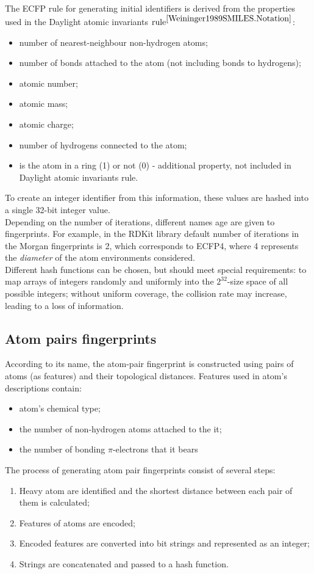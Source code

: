  The ECFP rule for generating initial identifiers is derived from the properties used in the Daylight atomic invariants $\text{rule}^{\cite{Weininger1989SMILES.Notation}}$:
 \begin{itemize}
     \item number of nearest-neighbour non-hydrogen atoms;
     \item number of bonds attached to the atom (not including bonds to hydrogens);
     \item atomic number;
     \item atomic mass;
     \item atomic charge;
     \item number of hydrogens connected to the atom;
     \item is the atom in a ring (1) or not (0) - additional property, not included in Daylight atomic invariants rule.
 \end{itemize}
 To create an integer identifier from this information, these values are hashed into a single 32-bit integer value.\\
 
 Depending on the number of iterations, different names age are given to fingerprints.
 For example, in the RDKit library default number of iterations in the Morgan fingerprints is 2, which corresponds to ECFP4, where 4 represents the \textit{diameter} of the atom environments considered.\\
 
 Different hash functions can be chosen, but should meet special requirements: to map arrays of integers randomly and uniformly into the $2^{32}$-size space of all possible integers; without uniform coverage, the collision rate may increase, leading to a loss of information.

\subsection{Atom pairs fingerprints}
 According to its name, the atom-pair fingerprint is constructed using pairs of atoms (as features) and their topological distances.
 Features used in atom's descriptions contain:
\begin{itemize}
    \item atom's chemical type;
    \item the number of non-hydrogen atoms attached to the it;
    \item the number of bonding $\pi$-electrons that it bears
\end{itemize}
The process of generating atom pair fingerprints consist of several steps:
\begin{enumerate}
    \item Heavy atom are identified and the shortest distance between each pair of them is calculated;
    \item Features of atoms are encoded;
    \item Encoded features are  converted into bit strings and represented as an integer;
    \item Strings are concatenated and passed to a hash function.
\end{enumerate}

